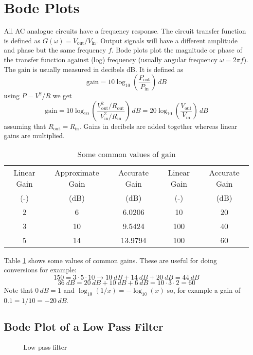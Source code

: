 \documentclass{article}
\begin{document}
    \section{Bode Plots}
    All AC analogue circuits have a frequency response.
    The circuit transfer function is defined as \(G(\omega) = V_\text{out}/V_\text{in}\).
    Output signals will have a different amplitude and phase but the same frequency \(f\).
    Bode plots plot the magnitude or phase of the transfer function against (log) frequency (usually angular frequency \(\omega = 2\pi f\)).
    The gain is usually measured in decibels \si{dB}.
    It is defined as
    \[\text{gain} = 10\log_{10}\left(\frac{P_\text{out}}{P_\text{in}}\right)\,\si{dB}\]
    using \(P = V^2/R\) we get
    \[\text{gain} = 10\log_{10}\left(\frac{V_\text{out}^2/R_\text{out}}{V_\text{in}^2/R_\text{in}}\right)\,\si{dB} = 20\log_{10}\left(\frac{V_\text{out}}{V_\text{in}}\right)\,\si{dB}\]
    assuming that \(R_\text{out} = R_\text{in}\).
    Gains in decibels are added together whereas linear gains are multiplied.
    \begin{table}[ht]
        \centering
        \begin{tabular}{|c|c|c||c|c|}\hline
            Linear Gain & Approximate Gain & Accurate Gain & Linear Gain &  Accurate Gain\\
            (-) & (\si{dB}) & (\si{dB}) & (-) & (\si{dB})\\ \hline
            2 & 6 & 6.0206 & 10 & 20\\ \hline
            3 & 10 & 9.5424 & 100 & 40\\ \hline
            5 & 14 & 13.9794 & 100 & 60\\ \hline
        \end{tabular}
        \caption{Some common values of gain}
        \label{tab:common gains}
    \end{table}
    Table \ref{tab:common gains} shows some values of common gains.
    These are useful for doing conversions for example:
    \[150 = 3\cdot 5 \cdot 10\to \SI{10}{dB} + \SI{14}{dB} + \SI{20}{dB} = \SI{44}{dB}\]
    \[\SI{36}{dB} = \SI{20}{dB} + \SI{10}{dB} + \SI{6}{dB} = 10 \cdot 3 \cdot 2 = 60\]
    Note that \(\SI{0}{dB} = 1\) and \(\log_{10}(1/x) = -\log_{10}(x)\) so, for example a gain of \(0.1 = 1/10 = -\SI{20}{dB}\).
    
    \subsection{Bode Plot of a Low Pass Filter}
    \begin{figure}[ht]
        \centering
        \caption{Low pass filter}
        \label{fig:low pass filter}
    \end{figure}
    
\end{document}
